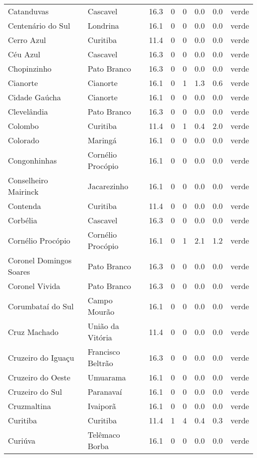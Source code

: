 \begin{longtable}{l|lllllll}
  Catanduvas & Cascavel & 16.3 & 0 & 0 & 0.0 & 0.0 & verde \\ 
  Centenário do Sul & Londrina & 16.1 & 0 & 0 & 0.0 & 0.0 & verde \\ 
  Cerro Azul & Curitiba & 11.4 & 0 & 0 & 0.0 & 0.0 & verde \\ 
  Céu Azul & Cascavel & 16.3 & 0 & 0 & 0.0 & 0.0 & verde \\ 
  Chopinzinho & Pato Branco & 16.3 & 0 & 0 & 0.0 & 0.0 & verde \\ 
  Cianorte & Cianorte & 16.1 & 0 & 1 & 1.3 & 0.6 & verde \\ 
  Cidade Gaúcha & Cianorte & 16.1 & 0 & 0 & 0.0 & 0.0 & verde \\ 
  Clevelândia & Pato Branco & 16.3 & 0 & 0 & 0.0 & 0.0 & verde \\ 
  Colombo & Curitiba & 11.4 & 0 & 1 & 0.4 & 2.0 & verde \\ 
  Colorado & Maringá & 16.1 & 0 & 0 & 0.0 & 0.0 & verde \\ 
  Congonhinhas & Cornélio Procópio & 16.1 & 0 & 0 & 0.0 & 0.0 & verde \\ 
  Conselheiro Mairinck & Jacarezinho & 16.1 & 0 & 0 & 0.0 & 0.0 & verde \\ 
  Contenda & Curitiba & 11.4 & 0 & 0 & 0.0 & 0.0 & verde \\ 
  Corbélia & Cascavel & 16.3 & 0 & 0 & 0.0 & 0.0 & verde \\ 
  Cornélio Procópio & Cornélio Procópio & 16.1 & 0 & 1 & 2.1 & 1.2 & verde \\ 
  Coronel Domingos Soares & Pato Branco & 16.3 & 0 & 0 & 0.0 & 0.0 & verde \\ 
  Coronel Vivida & Pato Branco & 16.3 & 0 & 0 & 0.0 & 0.0 & verde \\ 
  Corumbataí do Sul & Campo Mourão & 16.1 & 0 & 0 & 0.0 & 0.0 & verde \\ 
  Cruz Machado & União da Vitória & 11.4 & 0 & 0 & 0.0 & 0.0 & verde \\ 
  Cruzeiro do Iguaçu & Francisco Beltrão & 16.3 & 0 & 0 & 0.0 & 0.0 & verde \\ 
  Cruzeiro do Oeste & Umuarama & 16.1 & 0 & 0 & 0.0 & 0.0 & verde \\ 
  Cruzeiro do Sul & Paranavaí & 16.1 & 0 & 0 & 0.0 & 0.0 & verde \\ 
  Cruzmaltina & Ivaiporã & 16.1 & 0 & 0 & 0.0 & 0.0 & verde \\ 
  Curitiba & Curitiba & 11.4 & 1 & 4 & 0.4 & 0.3 & verde \\ 
  Curiúva & Telêmaco Borba & 16.1 & 0 & 0 & 0.0 & 0.0 & verde \\ 

\end{longtable}
